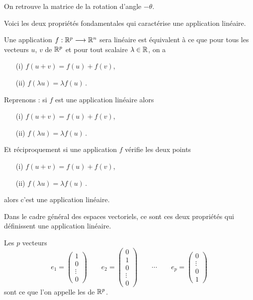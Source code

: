 On retrouve la matrice de la rotation d'angle $-\theta$.


\diapo

Voici les deux propriétés fondamentales qui caractérise une application linéaire.


Une application $f: \mathbb{R}^p \longrightarrow \mathbb{R}^n$ sera linéaire
est équivalent à ce que 
pour tous les vecteurs $u$, $v$ de $\mathbb{R}^p$ et pour tout scalaire $\lambda \in \mathbb{R}$,
on a
\begin{enumerate}
  \item[(i)]  $f(u+v) = f(u) + f(v)$,
  \item[(ii)] $ f(\lambda u) = \lambda f(u)\, .$
\end{enumerate} 


Reprenons : si $f$ est une application linéaire alors
\begin{enumerate}
  \item[(i)]  $f(u+v) = f(u) + f(v)$,
  \item[(ii)] $ f(\lambda u) = \lambda f(u)\, .$
\end{enumerate} 

Et réciproquement si une application $f$ vérifie les deux points
\begin{enumerate}
  \item[(i)]  $f(u+v) = f(u) + f(v)$,
  \item[(ii)] $ f(\lambda u) = \lambda f(u)\, .$
\end{enumerate} 
alors c'est une application linéaire.


Dans le cadre général des espaces vectoriels, ce sont ces deux propriétés 
qui définissent une application linéaire.

\diapo

Les $p$ vecteurs
$$
e_1 = \begin{pmatrix} 1\\0\\\vdots\\0\end{pmatrix}\qquad 
e_2 = \begin{pmatrix} 0\\1\\0\\\vdots\\0\end{pmatrix}\qquad\cdots\qquad
e_p = \begin{pmatrix} 0\\\vdots\\0\\1\end{pmatrix}
$$
sont ce que l'on appelle les  de $\mathbb{R}^p$.

